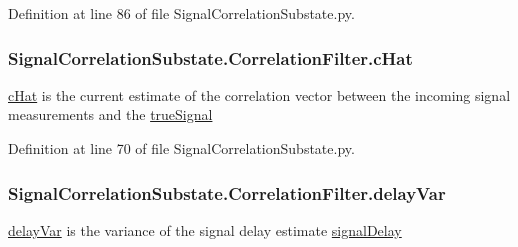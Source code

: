 Definition at line 86 of file Signal\+Correlation\+Substate.\+py.

\subsubsection[{\texorpdfstring{c\+Hat}{cHat}}]{\setlength{\rightskip}{0pt plus 5cm}Signal\+Correlation\+Substate.\+Correlation\+Filter.\+c\+Hat}\hypertarget{classSignalCorrelationSubstate_1_1CorrelationFilter_ad07b1d484b9ab77a1a8fc215f10faf15}{}\label{classSignalCorrelationSubstate_1_1CorrelationFilter_ad07b1d484b9ab77a1a8fc215f10faf15}


\hyperlink{classSignalCorrelationSubstate_1_1CorrelationFilter_ad07b1d484b9ab77a1a8fc215f10faf15}{c\+Hat} is the current estimate of the correlation vector between the incoming signal measurements and the \hyperlink{classSignalCorrelationSubstate_1_1CorrelationFilter_a67ff75effd8a8a7e34f0f3e8c56ef491}{true\+Signal} 



Definition at line 70 of file Signal\+Correlation\+Substate.\+py.

\subsubsection[{\texorpdfstring{delay\+Var}{delayVar}}]{\setlength{\rightskip}{0pt plus 5cm}Signal\+Correlation\+Substate.\+Correlation\+Filter.\+delay\+Var}\hypertarget{classSignalCorrelationSubstate_1_1CorrelationFilter_a34d52beb18c131f2305689d48f612a5a}{}\label{classSignalCorrelationSubstate_1_1CorrelationFilter_a34d52beb18c131f2305689d48f612a5a}


\hyperlink{classSignalCorrelationSubstate_1_1CorrelationFilter_a34d52beb18c131f2305689d48f612a5a}{delay\+Var} is the variance of the signal delay estimate \hyperlink{classSignalCorrelationSubstate_1_1CorrelationFilter_a01e35890dee1d79bd0e4f9e82cb16e3f}{signal\+Delay} 



